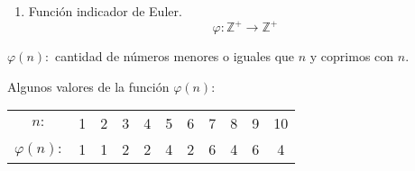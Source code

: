 \begin{enumerate}
\begin{theorem}
\begin{proof}[Demostración]
\begin{enumerate}
		\item Si $n>1$, entonces $\dc$. Si $d\divides n$ y $d$ posee un factor cuadrado perfecto mayor que 1, entonces $\mu(d)=0$.
		\[
		\sum_{d\divides n}\mu(d)=\underbrace{\cancelto{0}{\sum_{d\divides n}\mu(d)}}_{\displaystyle d\text{ posee algún factor }k^{2}>1}+\underbrace{\sum_{d\divides n}\mu(d)}_{\displaystyle d\text{ no posee factor }k^{2}>1}
		\]
		$d\divides n$ y $d$ no poseen factor $k^{2}>1$.
		
		$\displaystyle\implies d=p_{i1}p_{i2}\cdots p_{is}$
		\begin{align*}
		\implies \sum_{d\divides n}\mu(d)
		&=\mu(1)+\mu(p_1)+\mu(p_2)+\cdots+\mu(p_k)+&\\
		& \mu(p_1p_2)+\cdots+\mu(p_{k-1}p_{k})+\cdots\mu(p_1p_2\cdots p_k)&\\
		&=1\binom{k}{0}+(-1)\binom{k}{1}+{(-1)}^{2}\binom{k}{2}+\cdots+{(-1)}^{k}\binom{k}{k}&\\
		&={(1+(-1))}^{k}=0.&
		\end{align*}
	\end{enumerate}
\end{proof}
\end{theorem}

	\item Función indicador de Euler.
	\[\varphi\colon\mathbb{Z}^{+}\longrightarrow\mathbb{Z}^{+}\]
\end{enumerate}

$\varphi(n)\colon$ cantidad de números menores o iguales que $n$ y coprimos con $n$.

\begin{example}
	Algunos valores de la función $\varphi(n)\colon$
\begin{table}[H]
	\centering
	\begin{tabular}{ccccccccccc}
		$n\colon$ &1 &2 &3 & 4 & 5 & 6 & 7 & 8 &9 & 10\\[0.1cm]
		$\varphi(n)\colon$ &1 &1 & 2 &2 & 4 & 2 & 6 & 4 & 6 & 4
	\end{tabular}
\end{table}	

\end{example}


